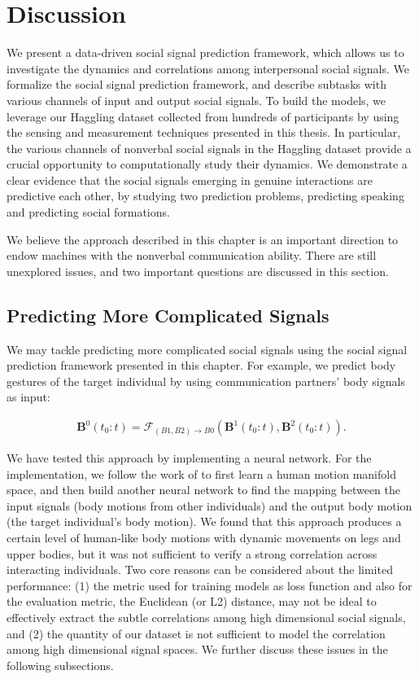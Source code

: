 
\section{Discussion}

We present a data-driven social signal prediction framework, which allows us to investigate the dynamics and correlations among interpersonal social signals. We formalize the social signal prediction framework, and describe subtasks with various channels of input and output social signals. To build the models, we leverage our Haggling dataset collected from hundreds of participants by using the sensing and measurement techniques presented in this thesis. In particular, the various channels of nonverbal social signals in the Haggling dataset provide a crucial opportunity to computationally study their dynamics. We demonstrate a clear evidence that the social signals emerging in genuine interactions are predictive each other, by studying two prediction problems, predicting speaking and predicting social formations.

We believe the approach described in this chapter is an important direction to endow machines with the nonverbal communication ability. There are still unexplored issues, and two important questions are discussed in this section. 

\subsection{Predicting More Complicated Signals}
We may tackle predicting more complicated social signals using the social signal prediction framework presented in this chapter. For example, we predict body gestures of the target individual by using communication partners' body signals as input:

\begin{gather}	
\mathbf{B}^0 (t_0:t) = \mathcal{F}_{(B1,B2)\rightarrow B0} \left( \mathbf{B}^1 (t_0:t), \mathbf{B}^2 (t_0:t) \right) .
\end{gather}

We have tested this approach by implementing a neural network. For the implementation, we follow the work of \cite{holden2016deep} to first learn a human motion manifold space, and then build another neural network to find the mapping between the input signals (body motions from other individuals) and the output body motion (the target individual's body motion). We found that this approach produces a certain level of human-like body motions with dynamic movements on legs and upper bodies, but it was not sufficient to verify a strong correlation across interacting individuals. Two core reasons can be considered about the limited performance: (1) the metric used for training models as loss function and also for the evaluation metric, the Euclidean (or L2) distance, may not be ideal to effectively extract the subtle correlations among high dimensional social signals, and (2) the quantity of our dataset is not sufficient to model the correlation among high dimensional signal spaces. We further discuss these issues in the following subsections.

